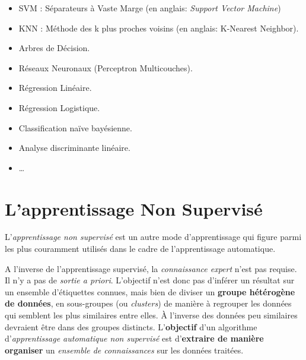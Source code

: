 \begin{itemize}
	\item SVM : Séparateurs à Vaste Marge (en anglais: \textit{Support Vector Machine})\\
	
	\item KNN : Méthode des k plus proches voisins (en anglais:  K-Nearest Neighbor).\\
	
	\item Arbres de Décision.\\
	
	\item Réseaux Neuronaux (Perceptron Multicouches).\\
	
	\item Régression Linéaire.\\
	
	\item Régression Logistique.\\
	
	\item Classification naïve bayésienne.\\
	
	\item Analyse discriminante linéaire.\\
	
	\item  \ldots
	
\end{itemize}
\clearpage	
	
\section{L'apprentissage Non Supervisé}

L'\textit{apprentissage non supervisé} est un autre mode d'apprentissage qui figure parmi les plus couramment utilisés dans le cadre de l'apprentissage automatique.

A l'inverse de l'apprentissage supervisé, la \textit{connaissance expert} n'est pas requise. Il n'y a pas de \textit{sortie a priori}. L'objectif n'est donc pas d'inférer un résultat sur un ensemble d'étiquettes connues, mais bien de diviser un \textbf{groupe hétérogène de données}, en sous-groupes (ou \textit{clusters}) de manière à regrouper les données qui semblent les plus similaires entre elles. À l'inverse des données peu similaires devraient être dans des groupes distincts. L'\textbf{objectif} d'un algorithme d'\textit{apprentissage automatique non supervisé} est d'\textbf{extraire de manière organiser} un \textit{ensemble de connaissances} sur les données traitées.


